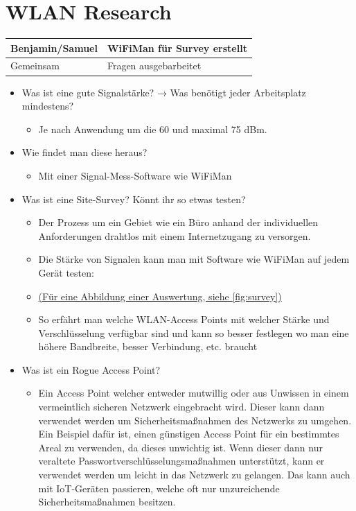 \documentclass{article}
\begin{document}
	\section{WLAN Research}
	\begin{tabular}{| l l |}
		\toprule
		Benjamin/Samuel & WiFiMan für Survey erstellt \\ \hline
		Gemeinsam & Fragen ausgebarbeitet \\
		\bottomrule
	\end{tabular}
	\label{sub:wlan_research}
	\begin{itemize}
		\item{Was ist eine gute Signalstärke? → Was benötigt jeder Arbeitsplatz mindestens?}
		\begin{itemize}
			\item{Je nach Anwendung um die 60 und maximal 75 dBm.}
		\end{itemize}
		\item{Wie findet man diese heraus?}
		\begin{itemize}
			\item{Mit einer Signal-Mess-Software wie WiFiMan}
		\end{itemize}
		\item{Was ist eine Site-Survey? Könnt ihr so etwas testen?}
		\begin{itemize}
			\item{Der Prozess um ein Gebiet wie ein Büro anhand der individuellen Anforderungen drahtlos mit einem Internetzugang zu versorgen.}
			\item{Die Stärke von Signalen kann man mit Software wie WiFiMan auf jedem Gerät testen:}
			\item[]{\hyperref[fig:survey]{(Für eine Abbildung einer Auswertung, siehe \ref{fig:survey})}}
			\item{So erfährt man welche WLAN-Access Points mit welcher Stärke und Verschlüsselung verfügbar sind und kann so besser festlegen wo man eine höhere Bandbreite, besser Verbindung, etc. braucht}
		\end{itemize}
		\item{Was ist ein Rogue Access Point?}
		\begin{itemize}
			\item{Ein Access Point welcher entweder mutwillig oder aus Unwissen in einem vermeintlich sicheren Netzwerk eingebracht wird. Dieser kann dann verwendet werden um Sicherheitsmaßnahmen des Netzwerks zu umgehen. Ein Beispiel dafür ist, einen günstigen Access Point für ein bestimmtes Areal zu verwenden, da dieses unwichtig ist. Wenn dieser dann nur veraltete Passwortverschlüsselungsmaßnahmen unterstützt, kann er verwendet werden um leicht in das Netzwerk zu gelangen. Das kann auch mit IoT-Geräten passieren, welche oft nur unzureichende Sicherheitsmaßnahmen besitzen.}

\end{itemize}
\end{itemize}
\end{document}
